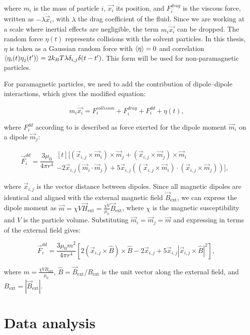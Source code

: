 where $m_i$ is the mass of particle $i$, $\vec{x_i}$ its position, and $F^{drag}_i$ is the viscous force, written as $-\lambda \dot{\vec{x}}_i$, with $\lambda$ the drag coefficient of the fluid. Since we are working at a scale where inertial effects are negligible, the term $m_i\ddot{\vec{x_i}}$ can be dropped. The random force $\eta(t)$ represents collisions with the solvent particles. In this thesis, $\eta$ is taken as a Gaussian random force with $\expval{\eta} = 0$ and correlation $\expval{\eta_i(t)\eta_j(t')} = 2k_B T \lambda \delta_{i,j}\delta(t-t')$. This form will be used for non-paramagnetic particles.

For paramagnetic particles, we need to add the contribution of dipole–dipole interactions, which gives the modified equation:

\begin{equation}
  m_i\ddot{\vec{x_i}} = F^{collision}_i + F^{drag}_i + F^{dd}_i + \eta(t)\text{,}
  \label{eq:langevindipole}
\end{equation}

where $F^{dd}_i$ according to \cite{yung1998analytic} is described as force exerted for the dipole moment $\vec{m}_i$ on a dipole $\vec{m}_j$:

\begin{equation}
  \label{eq:dipoledipoleforce}
\vec{F}^{dd}_i = \frac{3\mu_0}{4\pi r^4}
\begin{multlined}[t]
\bigl[ (\vec{x}_{i,j} \times \vec{m}_i) \times \vec{m}_j
    + (\vec{x}_{i,j} \times \vec{m}_j) \times \vec{m}_i \\
    - 2\vec{x}_{i,j}(\vec{m}_i \cdot \vec{m}_j)
    + 5\vec{x}_{i,j}((\vec{x}_{i,j} \times \vec{m}_i) \cdot (\vec{x}_{i,j} \times \vec{m}_j)) \bigr],
\end{multlined}
\end{equation}

where $\vec{x}_{i,j}$ is the vector distance between dipoles. Since all magnetic dipoles are identical and aligned with the external magnetic field $\vec{B}_{\text{ext}}$, we can express the dipole moment as $\vec{m} = \chi V \vec{H}_{\text{ext}} = \frac{\chi V}{\mu_0} \vec{B}_{\text{ext}}$, where $\chi$ is the magnetic susceptibility and $V$ is the particle volume. Substituting $\vec{m}_i = \vec{m}_j = \vec{m}$ and expressing in terms of the external field gives:

\begin{equation}
  \label{eq:dipoledipoleforce_Bext}
\vec{F}^{dd}_i = \frac{3\mu_0 m^2}{4\pi r^4}
\left[ 2(\vec{x}_{i,j} \times \hat{B}) \times \hat{B} - 2\vec{x}_{i,j} + 5\vec{x}_{i,j}|\vec{x}_{i,j} \times \hat{B}|^2 \right],
\end{equation}

where $m = \frac{\chi V B_{\text{ext}}}{\mu_0}$, $\hat{B} = \vec{B}_{\text{ext}}/B_{\text{ext}}$ is the unit vector along the external field, and $B_{\text{ext}} = |\vec{B}_{\text{ext}}|$.




\section{Data analysis}
